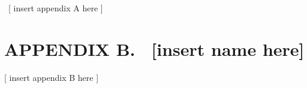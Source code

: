 \documentclass[twoside,letterpaper]{article}
\begin{document}
{\color{black}
\foreignlanguage{english}{\ }\foreignlanguage{english}{[ insert appendix
A here ]}}

\clearpage\section[APPENDIX B. \ [insert name
here{]}]{\rmfamily\bfseries\color{black}
APPENDIX B. \ [insert name here]}

\bigskip

{\color{black}
[ insert appendix B here ]}


\bigskip
\end{document}
